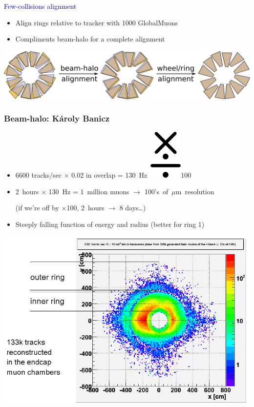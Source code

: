 \documentclass[compress]{beamer}
\begin{document}
\begin{frame}
\hspace{-0.83 cm} \textcolor{darkblue}{\Large Few-collisions alignment}

\vspace{0.1 cm}
\begin{itemize}\setlength{\itemsep}{0.2 cm}
\item Align rings relative to tracker with 1000 GlobalMuons
\item Compliments beam-halo for a complete alignment
\end{itemize}

\includegraphics[width=\linewidth]{two_step_procedure.png}
\end{frame}

\begin{frame}
\frametitle{Beam-halo: K\'aroly Banicz}
\begin{itemize}
\item 6600 tracks/sec $\times$ 0.02 in overlap = 130~Hz~\includegraphics[height=0.55\baselineskip]{timesdiv.png}100
\item 2~hours $\times$ 130~Hz = 1~million muons $\to$ \mbox{100's~of~$\mu$m~resolution~\hspace{-2 cm}}

(if we're off by $\times$100, 2~hours $\to$ 8 days\ldots)
\item Steeply falling function of energy and radius (better for ring 1)
\end{itemize}

\begin{center}
\includegraphics[width=0.8\linewidth]{beam-halo.png}
\end{center}
\end{frame}
\end{document}
